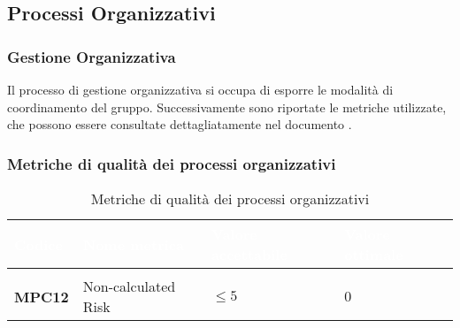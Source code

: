 \subsection{Processi Organizzativi}
\subsubsection{Gestione Organizzativa}
Il processo di gestione organizzativa si occupa di esporre le modalità di coordinamento del gruppo. Successivamente sono riportate le metriche utilizzate, che possono essere consultate dettagliatamente nel documento .

\subsubsection{Metriche di qualità dei processi organizzativi}
{
\renewcommand{\arraystretch}{1.5}
\centering
\begin{longtable}{C{2.5cm} C{6cm} C{3cm} C{3cm}}
\textcolor{white}{\textbf{Codice}}&
\textcolor{white}{\textbf{Nome metrica}}&
\textcolor{white}{\textbf{Valore accettabile}}&
\textcolor{white}{\textbf{Valore ottimale}}\\	
\hline
{}
 \\	
\endhead
\endfoot
{}\caption{Metriche di qualità dei processi organizzativi}
\endlastfoot

\textbf{MPC12} & Non-calculated Risk & $ \leq 5 $ & $ 0 $ \\
\end{longtable}
}